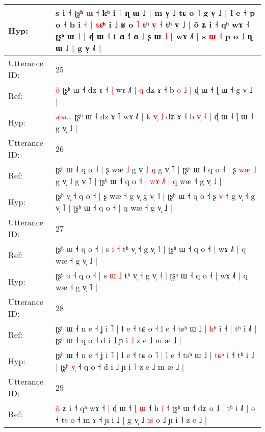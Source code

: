\documentclass[10pt]{article}
\DeclareRobustCommand{\hl}[1]{{\textcolor{red}{#1}}}
\begin{document}
\begin{longtable}{ll}
 \\
Hyp: & s i ˧ \hl{ʈ}\hl{ʂ}ʰ \hl{}\hl{ɯ} ˧ k\hl{ʰ} i \hl{˥} ɳ ɯ ˩ | m v̩ ˩ tɕ o \hl{˥} g v̩ ˩ | l e ˧ p o ˧ b i \hl{˧} | \hl{t}\hl{ɕ}ʰ i \hl{˩} ʁ o \hl{˥} tʰ \hl{v}\hl{̩} \hl{˧} tʰ v̩ ˩ | õ ʑ i ˧ qʰ wɤ ˧ ʈʂʰ ɯ \hl{˩} | ɖ ɯ ˧ t ɑ ˧˥\hl{}\hl{}\hl{}\hl{} ɑ ˩ ʂ ɯ \hl{˩} | wɤ ˩˥ | s \hl{ɯ} ˧ p o ˩ ɳ ɯ ˩ | g v̩ ˩˥ |
 \\
\midrule
Utterance ID: & 25 \\
Ref: & \hl{}\hl{}\hl{o}\hl{̃} ʈʂʰ ɯ ˧ dz ɤ\hl{ }\hl{˧} \hl{|} wɤ ˩˥ |\hl{}\hl{}\hl{}\hl{}\hl{} \hl{q} dʑ ɤ ˧ b \hl{}\hl{o} \hl{˩} | ɖ ɯ ˧ ɭ ɯ ˧ g v̩ ˩ |
 \\
Hyp: & \hl{ə}\hl{ə}\hl{ə}\hl{…} ʈʂʰ ɯ ˧ dz ɤ\hl{}\hl{} \hl{˥} wɤ ˩˥ |\hl{ }\hl{k}\hl{ }\hl{v}\hl{̩} \hl{˩} dʑ ɤ ˧ b \hl{v}\hl{̩} \hl{˧} | ɖ ɯ ˧ ɭ ɯ ˧ g v̩ ˩ |
 \\
\midrule
Utterance ID: & 26 \\
Ref: & ʈʂʰ \hl{}\hl{ɯ} ˧ q o ˧ | ʂ wæ \hl{˩} g v̩\hl{ }\hl{˩}\hl{ }\hl{ŋ} g v̩ ˥ | ʈʂʰ ɯ ˧ q o ˧\hl{ }\hl{|} ʂ \hl{w}\hl{æ} \hl{˩} g v̩ \hl{˩} g v̩ ˥ | ʈʂʰ ɯ ˧ q o ˧\hl{ }\hl{|}\hl{ }\hl{w}\hl{ɤ}\hl{ }\hl{˩}\hl{˥} | q wæ ˧ g v̩ ˩ |
 \\
Hyp: & ʈʂʰ \hl{v}\hl{̩} ˧ q o ˧ | ʂ wæ \hl{˧} g v̩\hl{}\hl{}\hl{}\hl{} g v̩ ˥ | ʈʂʰ ɯ ˧ q o ˧\hl{}\hl{} ʂ \hl{v}\hl{̩} \hl{˧} g v̩ \hl{˧} g v̩ ˥ | ʈʂʰ ɯ ˧ q o ˧\hl{}\hl{}\hl{}\hl{}\hl{}\hl{}\hl{}\hl{} | q wæ ˧ g v̩ ˩ |
 \\
\midrule
Utterance ID: & 27 \\
Ref: & ʈʂʰ \hl{ɯ} ˧ q o ˧ | s \hl{i} \hl{˧} tʰ v̩ ˧ g v̩ \hl{˥} | ʈʂʰ ɯ ˧ q o ˧ | wɤ ˩˥ | q wæ ˧ g v̩ \hl{˩} |
 \\
Hyp: & ʈʂʰ \hl{o} ˧ q o ˧ | s \hl{ɯ} \hl{˩} tʰ v̩ ˧ g v̩ \hl{˧} | ʈʂʰ ɯ ˧ q o ˧ | wɤ ˩˥ | q wæ ˧ g v̩ \hl{˥} |
 \\
\midrule
Utterance ID: & 28 \\
Ref: & ʈʂʰ ɯ ˧ n e ˧ ʝ i ˥ | l e ˧ tɕ o\hl{}\hl{} \hl{˧} l e ˧ tsʰ ɯ ˩ | \hl{}\hl{k}ʰ i ˧\hl{ }\hl{|} tʰ i ˩\hl{˥} | ʈʂʰ \hl{}\hl{ɯ} ˧ q o ˧ d i ˩ ɲ i \hl{˩} z e ˩ m æ ˩ |
 \\
Hyp: & ʈʂʰ ɯ ˧ n e ˧ ʝ i ˥ | l e ˧ tɕ o\hl{ }\hl{˥} \hl{|} l e ˧ tsʰ ɯ ˩ | \hl{t}\hl{ɕ}ʰ i ˧\hl{}\hl{} tʰ i ˩\hl{} | ʈʂʰ \hl{v}\hl{̩} ˧ q o ˧ d i ˩ ɲ i \hl{˥} z e ˩ m æ ˩ |
 \\
\midrule
Utterance ID: & 29 \\
Ref: & \hl{}\hl{}\hl{o}\hl{̃} ʑ i ˧ qʰ wɤ ˧\hl{ }\hl{|} ɖ ɯ ˧ \hl{ɭ} \hl{}\hl{ɯ} ˧ h \hl{i}\hl{̃} ˧ ʈʂʰ ɯ ˧ dʑ o ˩ | tʰ i ˩˥ | ə ˧ ts o ˧ m ɤ ˧ ɲ i ˩ | g v̩ ˩ \hl{t}\hl{s} o ˩ ɲ i ˥ z e ˩ |

\end{longtable}
\end{document}
